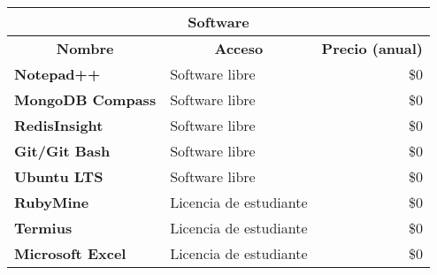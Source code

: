 \begin{center}
	\begin{tabular}{ | l | p{5cm} | p{5cm}|}
		\hline
		\multicolumn{3}{|c|}{\textbf{Software}} \\
		\hline
		\multicolumn{1}{|c|}{\textbf{Nombre}} & \multicolumn{1}{|c|}{\textbf{Acceso}} & \multicolumn{1}{|c|}{\textbf{Precio (anual)}} \\
		\hline
		{\textbf{Notepad++}} & Software libre & \multicolumn{1}{|r|}{\$0} \\ \hline

		{\textbf{MongoDB Compass}} & Software libre & \multicolumn{1}{|r|}{\$0} \\ \hline
		
		{\textbf{RedisInsight}} & Software libre & \multicolumn{1}{|r|}{\$0} \\ \hline
		
		{\textbf{Git/Git Bash}} & Software libre & \multicolumn{1}{|r|}{\$0} \\ \hline
		
		{\textbf{Ubuntu LTS}} & Software libre & \multicolumn{1}{|r|}{\$0} \\ \hline
		
		{\textbf{RubyMine}} & Licencia de estudiante & \multicolumn{1}{|r|}{\$0} \\ \hline
		
		{\textbf{Termius}} & Licencia de estudiante & \multicolumn{1}{|r|}{\$0} \\ \hline
		
		{\textbf{Microsoft Excel}} & Licencia de estudiante & \multicolumn{1}{|r|}{\$0} \\ \hline
	\end{tabular}

  \label{table:costs:software}
\end{center}

